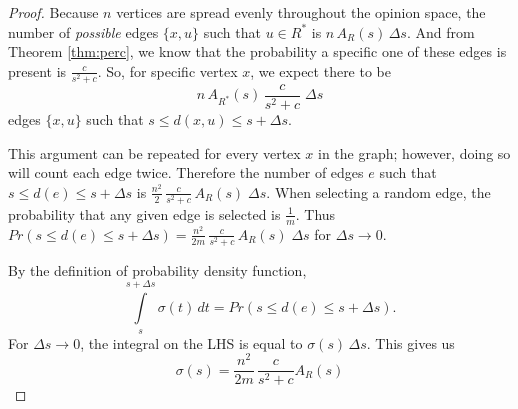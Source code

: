 \documentclass[a4paper,10pt]{article}
\begin{document}
\begin{proof}
Because $n$ vertices are spread evenly throughout the opinion space, the number of \emph{possible} edges $\{x, u\}$ such that $u \in R^*$ is 
$n \, A_{R}(s) \, \Delta s.$ And from Theorem \ref{thm:perc}, we know that the probability a specific one of these edges is present is $\frac{c}{s^2 + c}$. So, for specific vertex $x$, we expect there to be 
\begin{equation}
n\,A_{R^*}(s)\,\frac{c}{s^2 + c} \; \Delta s 
\end{equation}
 edges $\{x, u\}$ such that $s \leq d(x, u) \leq s + \Delta s.$ 

This argument can be repeated for every vertex $x$ in the graph; however, doing so will count each edge twice. Therefore the number of edges $e$ such that $s \leq d(e) \leq s + \Delta s$ is $\frac{n^2}{2}\,\frac{c}{s^2 + c}\,A_{R}(s) \; \Delta s $. When selecting a random edge, the probability that any given edge is selected is $\frac{1}{m}$. Thus $Pr(s \leq d(e) \leq s + \Delta s) = \frac{n^2}{2m}\,\frac{c}{s^2 + c}\,A_{R}(s) \; \Delta s $ for $\Delta s \to 0$.

By the definition of probability density function, 
\begin{equation}
 \int\limits_{s}^{s + \Delta s} \sigma(t)\,dt = Pr(s \leq d(e) \leq s + \Delta s).
\end{equation}
For $\Delta s \to 0$, the integral on the LHS is equal to $\sigma(s) \, \Delta s$. This gives us
 \begin{equation}
 \sigma(s) = \frac{n^2}{2m}\,\frac{c}{s^2 + c} A_{R}(s)
 \end{equation}
\end{proof}
\end{document}
